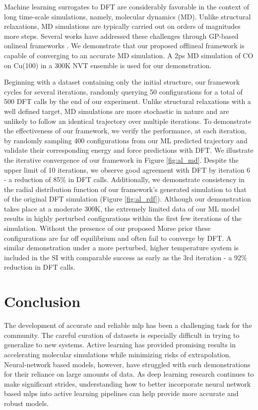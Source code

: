 \documentclass[
 reprint,
 amsmath,
 amssymb,
 aps,
]{revtex4-1}
\begin{document}

Machine learning surrogates to DFT are considerably favorable in the context of long time-scale simulations, namely, molecular dynamics (MD). Unlike structural relaxations, MD simulations are typically carried out on orders of magnitudes more steps. Several works have addressed these challenges through GP-based \gls{onlineal} frameworks \cite{Vandermause2020, Jinnouchi2019}. We demonstrate that our proposed \gls{offlineal} framework is capable of converging to an accurate MD simulation. A 2ps MD simulation of CO on Cu(100) in a 300K NVT ensemble is used for our demonstration. 

 Beginning with a dataset containing only the initial structure, our framework cycles for several iterations, randomly querying 50 configurations for a total of 500 DFT calls by the end of our experiment. Unlike structural relaxations with a well defined target, MD simulations are more stochastic in nature and are unlikely to follow an identical trajectory over multiple iterations. To demonstrate the effectiveness of our framework, we verify the performance, at each iteration, by randomly sampling 400 configurations from our ML predicted trajectory and validate their corresponding energy and force predictions with DFT. We illustrate the iterative convergence of our framework in Figure \ref{fig:al_md}. Despite the upper limit of 10 iterations, we observe good agreement with DFT by iteration 6 - a reduction of 85\% in DFT calls. Additionally, we demonstrate consistency in the radial distribution function of our framework's generated simulation to that of the original DFT simulation (Figure \ref{fig:al_rdf}). Although our demonstration takes place at a moderate 300K, the extremely limited data of our ML model results in highly perturbed configurations within the first few iterations of the simulation. Without the presence of our proposed Morse prior these configurations are far off equilibrium and often fail to converge by DFT.  A similar demonstration under a more perturbed, higher temperature system is included in the SI with comparable success as early as the 3rd iteration - a 92\% reduction in DFT calls.

\section{Conclusion}

The development of accurate and reliable \gls{mlp} has been a challenging task for the community. The careful curation of datasets is especially difficult in trying to generalize to new systems. Active learning has provided promising results in accelerating molecular simulations while minimizing risks of extrapolation. Neural-network based models, however, have struggled with such demonstrations for their reliance on large amounts of data. As deep learning research continues to make significant strides, understanding how to better incorporate neural network based \gls{mlp}s into active learning pipelines can help provide more accurate and robust models.
\end{document}
